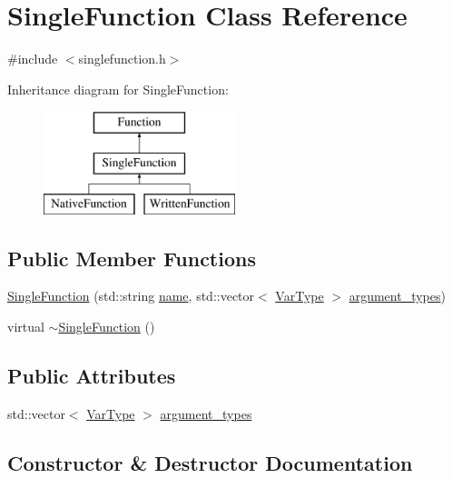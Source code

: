 \hypertarget{classSingleFunction}{}\section{Single\+Function Class Reference}
\label{classSingleFunction}


{\ttfamily \#include $<$singlefunction.\+h$>$}

Inheritance diagram for Single\+Function\+:\begin{figure}[H]
\begin{center}
\leavevmode
\includegraphics[height=3.000000cm]{classSingleFunction}
\end{center}
\end{figure}
\subsection*{Public Member Functions}
\begin{DoxyCompactItemize}
\item 
\hyperlink{classSingleFunction_a05cebea02bb5f8ca44fcfe5a81c6336b}{Single\+Function} (std\+::string \hyperlink{classFunction_a161d1ceb4f67f3222caf429fea7b71f1}{name}, std\+::vector$<$ \hyperlink{classVarType}{Var\+Type} $>$ \hyperlink{classSingleFunction_a345cc7c6a42587a62495688af6644a26}{argument\+\_\+types})
\item 
virtual \hyperlink{classSingleFunction_ae414926a60c49b4039e7cd41a304ed77}{$\sim$\+Single\+Function} ()
\end{DoxyCompactItemize}
\subsection*{Public Attributes}
\begin{DoxyCompactItemize}
\item 
std\+::vector$<$ \hyperlink{classVarType}{Var\+Type} $>$ \hyperlink{classSingleFunction_a345cc7c6a42587a62495688af6644a26}{argument\+\_\+types}
\end{DoxyCompactItemize}


\subsection{Constructor \& Destructor Documentation}
\mbox{\label{classSingleFunction_a05cebea02bb5f8ca44fcfe5a81c6336b}} 
